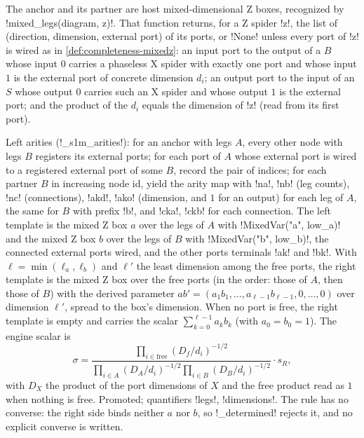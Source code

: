 The anchor and its partner are host mixed-dimensional Z boxes, recognized by
\py!mixed_legs(diagram, z)!. That function returns, for a Z spider \code!z!, the list of
(direction, dimension, external port) of its ports, or \py!None! unless every port of \code!z! is
wired as in \cref{def:completeness-mixedz}: an input port to the output of a $B$ whose input $0$
carries a phaseless X spider with exactly one port and whose input $1$ is the external port of
concrete dimension $d_i$; an output port to the input of an $S$ whose output $0$ carries such an X
spider and whose output $1$ is the external port; and the product of the $d_i$ equals the
dimension of \code!z! (read from its first port).

Left arities (\py!_s1m_arities!): for an anchor with legs $A$, every other node with legs $B$
registers its external ports; for each port of $A$ whose external port is wired to a registered
external port of some $B$, record the pair of indices; for each partner $B$ in increasing node id,
yield the arity map with \code!na!, \code!nb! (leg counts), \code!nc! (connections),
\code!a{k}d!, \code!a{k}o! (dimension, and $1$ for an output) for each leg of $A$, the same for
$B$ with prefix \code!b!, and \code!c{k}a!, \code!c{k}b! for each connection. The left template is
the mixed Z box $a$ over the legs of $A$ with \py!MixedVar("a", low_a)! and the mixed Z box $b$
over the legs of $B$ with \py!MixedVar("b", low_b)!, the connected external ports wired, and the
other ports terminals \code!a{k}! and \code!b{k}!. With $\ell=\min(\ell_a,\ell_b)$ and $\ell'$ the
least dimension among the free ports, the right template is the mixed Z box over the free ports
(in the order: those of $A$, then those of $B$) with the derived parameter
$ab'=(a_1b_1,\dots,a_{\ell-1}b_{\ell-1},0,\dots,0)$ over dimension $\ell'$, spread to the box's
dimension. When no port is free, the right template is empty and carries the scalar
$\sum_{k=0}^{\ell-1}a_kb_k$ (with $a_0=b_0=1$). The engine scalar is
\[
\sigma=\frac{\prod_{i\in\text{free}}(D_f/d_i)^{-1/2}}{\prod_{i\in A}(D_A/d_i)^{-1/2}\prod_{i\in B}(D_B/d_i)^{-1/2}}\cdot s_R,
\]
with $D_X$ the product of the port dimensions of $X$ and the free product read as $1$ when nothing
is free. Promoted; quantifiers \code!legs!, \code!dimensions!. The rule has no converse: the
right side binds neither $a$ nor $b$, so \py!_determined! rejects it, and no explicit converse is
written.


